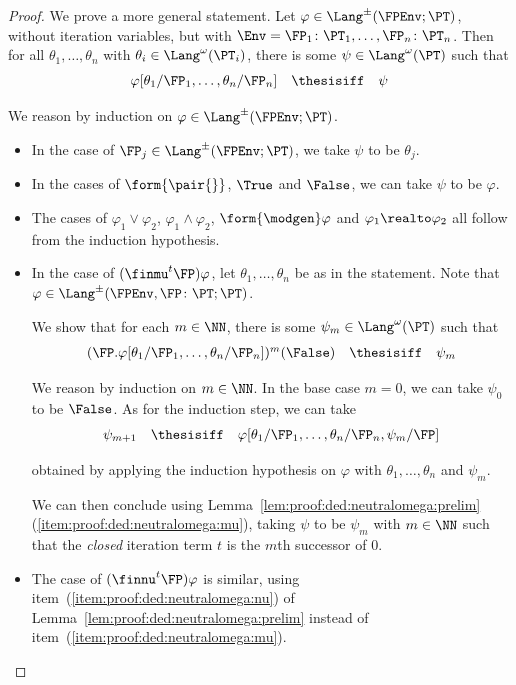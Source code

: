 \begin{proof}
We prove a more general statement.
Let $\varphi \in \Lang^\pm(\FPEnv;\PT)$,
without iteration variables,
but with $\Env = \FP_1\colon\PT_1,\dots,\FP_n\colon\PT_n$.
Then for all $\theta_1,\dots,\theta_n$
with $\theta_i \in \Lang^\omega(\PT_i)$,
there is some $\psi \in \Lang^\omega(\PT)$
such that
\[
\begin{array}{l l l}
  \varphi[\theta_1 / \FP_1, \dots, \theta_n / \FP_n] 
& \thesisiff
& \psi
\end{array}
\]

We reason by induction on $\varphi \in \Lang^\pm(\FPEnv;\PT)$.
\begin{itemize}
\item In the case of $\FP_j \in \Lang^\pm(\FPEnv;\PT)$,
we take $\psi$ to be $\theta_j$.

\item In the cases of $\form{\pair{}}$, $\True$ and $\False$,
we can take $\psi$ to be $\varphi$.

\item
The cases of $\varphi_1 \lor \varphi_2$, $\varphi_1 \land \varphi_2$,
$\form{\modgen}\varphi$ and $\varphi_1 \realto \varphi_2$
all follow from the induction hypothesis.

\item
In the case of $(\finmu^t \FP)\varphi$,
let $\theta_1,\dots,\theta_n$ be as in the statement.
Note that $\varphi \in \Lang^{\pm}(\FPEnv, \FP\colon\PT; \PT)$.

We show that for each $m \in \NN$,
there is some $\psi_m \in \Lang^\omega(\PT)$ such that
\[
\begin{array}{l l l}
  (\FP.\varphi[\theta_1 / \FP_1, \dots, \theta_n / \FP_n])^m(\False)
& \thesisiff
& \psi_m
\end{array}
\]

We reason by induction on $m \in \NN$.
In the base case $m = 0$, we can take $\psi_0$ to be $\False$.
As for the induction step, we can take
\[
\begin{array}{l l l}
  \psi_{m+1}
& \thesisiff
& \varphi[\theta_1 / \FP_1, \dots, \theta_n / \FP_n, \psi_m / \FP]
\end{array}
\]

\noindent
obtained by applying the induction hypothesis on $\varphi$
with $\theta_1,\dots,\theta_n$ and $\psi_m$.

We can then conclude using
Lemma~\ref{lem:proof:ded:neutralomega:prelim}(\ref{item:proof:ded:neutralomega:mu}),
taking $\psi$ to be $\psi_m$ with
$m \in \NN$ such that the \emph{closed} iteration term $t$
is the $m$th successor of $0$.

\item
The case of $(\finnu^t \FP)\varphi$
is similar, using item~(\ref{item:proof:ded:neutralomega:nu})
of Lemma~\ref{lem:proof:ded:neutralomega:prelim}
instead of item~(\ref{item:proof:ded:neutralomega:mu}).
\qedhere
\end{itemize}
\end{proof}
